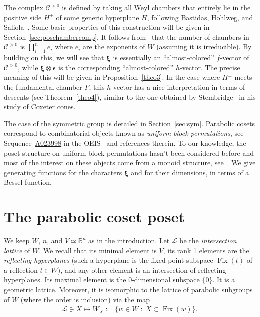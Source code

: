\documentclass[11pt]{article}
\theoremstyle{definition}
\DeclareMathOperator{\Fix}{Fix}
\newcommand{\bxi}{\boldsymbol{\xi}}
\newcommand{\bepsilon}{\boldsymbol{\epsilon}}
\newcommand{\LL}{\mathcal{L}}
\newcommand{\CCP}{\mathcal{C}^{>0}}
\begin{document}
The complex $\CCP$ is defined by taking all Weyl chambers that entirely lie in the positive side $H^+$ of some generic hyperplane $H$, following Bastidas, Hohlweg, and Saliola~\cite{bastidashohlwegsaliola}. Some basic properties of this construction will be given in Section~\ref{sec:poschambercomp}.  It follows from~\cite{greenezaslavsky} that the number of chambers in $\CCP$ is $\prod_{i=1}^n e_i $ where $e_i$ are the exponents of $W$ (assuming it is irreducible).  By building on this, we will see that $\bxi$ is essentially an ``almost-colored'' $f$-vector of $\CCP$, while $\bxi\otimes\bepsilon$ is the corresponding ``almost-colored'' $h$-vector.  The precise meaning of this will be given in Proposition~\ref{theo3}.  In the case where $H^\perp$ meets the fundamental chamber $F$, this $h$-vector has a nice interpretation in terms of descents (see Theorem~\ref{theo4}), similar to the one obtained by Stembridge~\cite{stembridge} in his study of Coxeter cones.

The case of the symmetric group is detailed in Section~\ref{sec:sym}.  Parabolic cosets correspond to combinatorial objects known as {\it uniform block permutations}, see Sequence~\href{https://oeis.org/A023998}{A023998} in the OEIS~\cite{oeis} and references therein. To our knowledge, the poset structure on uniform block permutations hasn't been considered before and most of the interest on these objects come from a monoid structure, see~\cite{fitzgerald}.  We give generating functions for the characters $\bxi$ and for their dimensions, in terms of a Bessel function.

\section{The parabolic coset poset}
\label{sec:defpp}

We keep $W$, $n$, and $V\simeq\mathbb{R}^n$ as in the introduction.  Let $\LL$ be the {\it intersection lattice} of $W$.  We recall that its minimal element is $V$, its rank 1 elements are the {\it reflecting hyperplanes} (such a hyperplane is the fixed point subspace $\Fix(t)$ of a reflection $t\in W$), and any other element is an intersection of reflecting hyperplanes.  Its maximal element is the $0$-dimensional subspace $\{0\}$. It is a geometric lattice. Moreover, it is isomorphic to the lattice of parabolic subgroups of $W$ (where the order is inclusion) via the map
\begin{align} \label{eq:isoLL}
    \LL \owns X \mapsto W_X := \{ w \in W \;:\; X\subset \Fix(w) \}.
\end{align}
\end{document}
